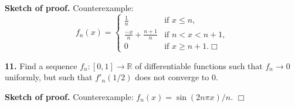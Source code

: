\documentclass{article}
\begin{document}
\textbf{Sketch of proof.} Counterexample: \[f_n(x) = \begin{cases}
\frac{1}{n} &\text{if }x\le n,\\
\frac{-x}{n} + \frac{n+1}{n} &\text{if } n < x < n+1,\\
0 &\text{if }x\ge n+1. \Box
\end{cases}\]

    \textbf{11.} Find a sequence $f_n:[0,1]\to \mathbb{R}$ of differentiable
functions such that $f_n \to 0$ uniformly, but such that $f'_n(1/2)$
does not converge to $0$.

\textbf{Sketch of proof.} Counterexample: $f_n(x) = \sin(2n\pi x)/n$.
$\Box$


    
    
    
    
\end{document}
